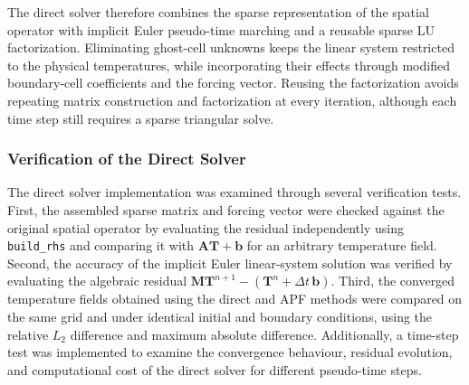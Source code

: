 The direct solver therefore combines the sparse representation
of the spatial operator with implicit Euler pseudo-time marching
and a reusable sparse LU factorization. Eliminating ghost-cell
unknowns keeps the linear system restricted to the physical
temperatures, while incorporating their effects through
modified boundary-cell coefficients and the forcing vector.
Reusing the factorization avoids repeating matrix construction
and factorization at every iteration, although each time step
still requires a sparse triangular solve.

\subsubsection{Verification of the Direct Solver}
\label{subsubsec:direct_verification}

The direct solver implementation was examined through several
verification tests. First, the assembled sparse matrix and
forcing vector were checked against the original spatial
operator by evaluating the residual independently using
\texttt{build\_rhs} and comparing it with
$\mathbf{A}\mathbf{T}+\mathbf{b}$ for an arbitrary temperature
field. Second, the accuracy of the implicit Euler linear-system
solution was verified by evaluating the algebraic residual
$\mathbf{M}\mathbf{T}^{n+1}-(\mathbf{T}^{n}+\Delta t\,\mathbf{b})$.
Third, the converged temperature fields obtained using the
direct and APF methods were compared on the same grid and
under identical initial and boundary conditions, using the
relative $L_2$ difference and maximum absolute difference.
Additionally, a time-step test was implemented to examine
the convergence behaviour, residual evolution, and computational
cost of the direct solver for different pseudo-time steps.